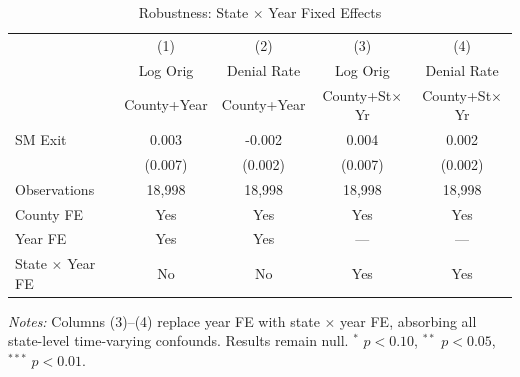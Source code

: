 \begin{table}[htbp]
\centering
\caption{Robustness: State $\times$ Year Fixed Effects}
\label{tab:stateyear}
\begin{tabular}{lcccc}
\toprule
 & (1) & (2) & (3) & (4) \\
 & Log Orig & Denial Rate & Log Orig & Denial Rate \\
 & County+Year & County+Year & County+St$\times$Yr & County+St$\times$Yr \\
\midrule
SM Exit & 0.003 & -0.002 & 0.004 & 0.002 \\
 & (0.007) & (0.002) & (0.007) & (0.002) \\
\addlinespace
Observations & 18,998 & 18,998 & 18,998 & 18,998 \\
County FE & Yes & Yes & Yes & Yes \\
Year FE & Yes & Yes & --- & --- \\
State $\times$ Year FE & No & No & Yes & Yes \\
\bottomrule
\end{tabular}
\begin{tablenotes}
\item \textit{Notes:} Columns (3)--(4) replace year FE with state $\times$ year FE,
absorbing all state-level time-varying confounds. Results remain null.
$^{*}$ $p < 0.10$, $^{**}$ $p < 0.05$, $^{***}$ $p < 0.01$.
\end{tablenotes}
\end{table}
